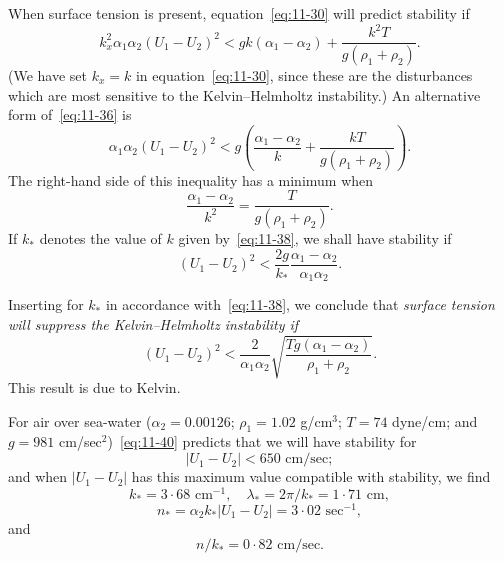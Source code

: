 When surface tension is present, equation~\eqref{eq:11-30} will predict stability if
\begin{equation}
\label{eq:11-36}
k_x^2\alpha_1\alpha_2(U_1-U_2)^2 < gk\!\left(\alpha_1-\alpha_2\right)+\frac{k^2T}{g(\rho_1+\rho_2)}.
\end{equation}
(We have set $k_x = k$ in equation~\eqref{eq:11-30}, since these are the disturbances which are most sensitive to the Kelvin--Helmholtz instability.) An alternative form of~\eqref{eq:11-36} is
\begin{equation}
\label{eq:11-37}
\alpha_1\alpha_2(U_1-U_2)^2 < g\!\left(\frac{\alpha_1-\alpha_2}{k}+\frac{kT}{g(\rho_1+\rho_2)}\right)\!.
\end{equation}
The right-hand side of this inequality has a minimum when
\begin{equation}
\label{eq:11-38}
\frac{\alpha_1-\alpha_2}{k^2} = \frac{T}{g(\rho_1+\rho_2)}.
\end{equation}
If $k_*$ denotes the value of $k$ given by~\eqref{eq:11-38}, we shall have stability if
\begin{equation}
\label{eq:11-39}
(U_1-U_2)^2 < \frac{2g}{k_*}\frac{\alpha_1-\alpha_2}{\alpha_1\alpha_2}.
\end{equation}

Inserting for $k_*$ in accordance with~\eqref{eq:11-38}, we conclude that \textit{surface tension will suppress the Kelvin--Helmholtz instability if}
\begin{equation}
\label{eq:11-40}
(U_1-U_2)^2 < \frac{2}{\alpha_1\alpha_2}\sqrt{\frac{Tg(\alpha_1-\alpha_2)}{\rho_1+\rho_2}}.
\end{equation}
This result is due to Kelvin.

For air over sea-water ($\alpha_2 = 0.00126$; $\rho_1 = 1.02$ g/cm$^3$; $T = 74$ dyne/cm; and $g = 981$ cm/sec$^2$)~\eqref{eq:11-40} predicts that we will have stability for
\begin{equation}
\label{eq:11-41}
|U_1-U_2| < 650\text{ cm/sec};
\end{equation}
and when $|U_1-U_2|$ has this maximum value compatible with stability, we find
\begin{equation}
\label{eq:11-42}
k_* = 3{\cdot}68\text{ cm}^{-1}, \quad \lambda_* = 2\pi/k_* = 1{\cdot}71\text{ cm},
\end{equation}
\[
n_* = \alpha_2 k_*|U_1-U_2| = 3{\cdot}02\text{ sec}^{-1},
\]
and
\[
n/k_* = 0{\cdot}82\text{ cm/sec.}
\]

